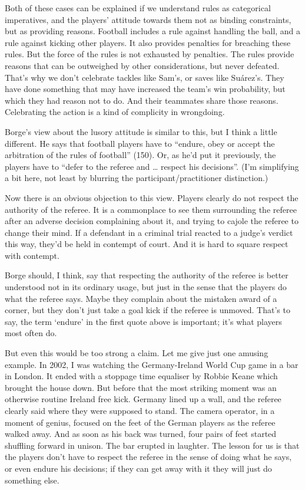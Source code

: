 \documentclass[
  11pt,
  letterpaper,
  DIV=11,
  numbers=noendperiod,
  oneside]{scrartcl}
\begin{document}
Both of these cases can be explained if we understand rules as
categorical imperatives, and the players' attitude towards them not as
binding constraints, but as providing reasons. Football includes a rule
against handling the ball, and a rule against kicking other players. It
also provides penalties for breaching these rules. But the force of the
rules is not exhausted by penalties. The rules provide reasons that can
be outweighed by other considerations, but never defeated. That's why we
don't celebrate tackles like Sam's, or saves like Suárez's. They have
done something that may have increased the team's win probability, but
which they had reason not to do. And their teammates share those
reasons. Celebrating the action is a kind of complicity in wrongdoing.

Borge's view about the lusory attitude is similar to this, but I think a
little different. He says that football players have to ``endure, obey
or accept the arbitration of the rules of football'' (150). Or, as he'd
put it previously, the players have to ``defer to the referee and
\ldots{} respect his decisions''. (I'm
simplifying a bit here, not least by blurring the
participant/practitioner distinction.)

Now there is an obvious objection to this view. Players clearly do not
respect the authority of the referee. It is a commonplace to see them
surrounding the referee after an adverse decision complaining about it,
and trying to cajole the referee to change their mind. If a defendant in
a criminal trial reacted to a judge's verdict this way, they'd be held
in contempt of court. And it is hard to square respect with contempt.

Borge should, I think, say that respecting the authority of the referee
is better understood not in its ordinary usage, but just in the sense
that the players do what the referee says. Maybe they complain about the
mistaken award of a corner, but they don't just take a goal kick if the
referee is unmoved. That's to say, the term `endure' in the first quote
above is important; it's what players most often do.

But even this would be too strong a claim. Let me give just one amusing
example. In 2002, I was watching the Germany-Ireland World Cup game in a
bar in London. It ended with a stoppage time equaliser by Robbie Keane
which brought the house down. But before that the most striking moment
was an otherwise routine Ireland free kick. Germany lined up a wall, and
the referee clearly said where they were supposed to stand. The camera
operator, in a moment of genius, focused on the feet of the German
players as the referee walked away. And as soon as his back was turned,
four pairs of feet started shuffling forward in unison. The bar erupted
in laughter. The lesson for us is that the players don't have to respect
the referee in the sense of doing what he says, or even endure his
decisions; if they can get away with it they will just do something
else.
\end{document}
